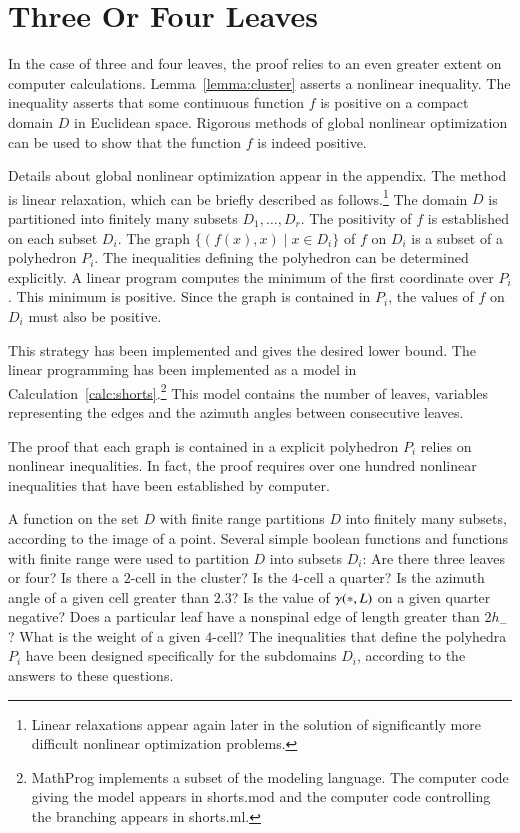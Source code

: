 \section{Three Or Four Leaves}\label{sec:3or4}

In the case of three and four leaves, the proof relies to an even
greater extent on computer calculations.  
Lemma~\ref{lemma:cluster} asserts a nonlinear inequality.  The inequality
asserts that some continuous function $f$ is positive on a compact
domain $D$ in Euclidean space.  Rigorous methods of global nonlinear
optimization can be used to show that the function $f$ is indeed
positive.

Details about global nonlinear optimization appear in the appendix.
The method is linear relaxation, which can be briefly described as
follows.\footnote{Linear relaxations appear again later in the
solution of significantly more difficult nonlinear optimization
problems.}  The domain $D$ is partitioned into finitely many subsets
$D_1,\ldots, D_r$.  The positivity of $f$ is established on each
subset $D_i$.  The graph $\{(f(x), x)\mid x\in D_i\}$ of $f$ on $D_i$
is a subset of a polyhedron $P_i$.  The inequalities defining the
polyhedron can be determined explicitly.  A linear program computes
the minimum of the first coordinate over $P_i$.  This minimum is
positive.  Since the graph is contained in $P_i$, the values of $f$ on
$D_i$ must also be positive.

This strategy has been implemented and gives the desired lower bound.
The linear programming has been implemented as a  model
in Calculation~\ref{calc:shorts}.\footnote{MathProg implements a
subset of the  modeling language.  The computer code
giving the model appears in shorts.mod and the computer code
controlling the branching appears in shorts.ml.}  This model
contains the number of leaves, variables representing the edges and
the azimuth angles between consecutive leaves.

The proof that each graph is contained in a explicit polyhedron $P_i$
relies on nonlinear inequalities.  In fact, the proof requires over
one hundred nonlinear inequalities that have been established by
computer.

A function on the set $D$ with finite range partitions $D$ into
finitely many subsets, according to the image of a point.  Several
simple boolean functions and functions with finite range were used to
partition $D$ into subsets $D_i$: Are there three leaves or four?  Is
there a $2$-cell in the cluster?  Is the $4$-cell a quarter?  Is the
azimuth angle of a given cell greater than $2.3$?  Is the value of
$\gamma({*},L)$ on a given quarter negative? Does a particular leaf have a
nonspinal edge of length greater than $2h_-$?  What is the weight of a
given $4$-cell?  The inequalities that define the polyhedra $P_i$ have
been designed specifically for the subdomains $D_i$, according to the
answers to these questions.


